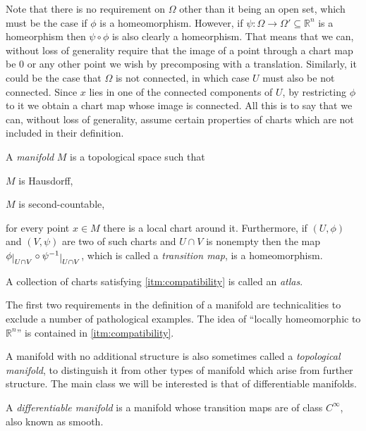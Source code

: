 \documentclass[12pt,oneside]{book}
\numberwithin{table}{section}
\numberwithin{equation}{section}
\numberwithin{figure}{section}
\newcommand{\rest}[1]{\raisebox{-.5ex}{$|$}_{#1}}
\newcommand{\R}{\mathbb{R}}
\begin{document}
Note that there is no requirement on \( \Omega \) other than it being an open set, which must be the case if \( \phi \) is a homeomorphism. However, if \( \psi \colon \Omega \to \Omega' \subseteq \R^n \) is a homeorphism then \( \psi \circ \phi \) is also clearly a homeorphism. That means that we can, without loss of generality require that the image of a point through a chart map be 0 or any other point we wish by precomposing with a translation. Similarly, it could be the case that \( \Omega \) is not connected, in which case \( U \) must also be not connected. Since \( x \) lies in one of the connected components of \( U \), by restricting \( \phi \) to it we obtain a chart map whose image is connected. All this is to say that we can, without loss of generality, assume certain properties of charts which are not included in their definition.

\begin{defn}[Manifold]
	A \emph{manifold} \( M \) is a topological space such that
	\begin{points}
		\item \( M \) is Hausdorff,
		\item \( M \) is second-countable,
		\item \label{itm:compatibility} for every point \( x \in M \) there is a local chart around it. Furthermore, if \( (U,\phi) \) and \( (V, \psi) \) are two of such charts and \( U \cap V \) is nonempty then the map \( \phi\rest{U \cap V} \circ \psi^{-1}\rest{U \cap V} \), which is called a \emph{transition map}, is a homeomorphism. 
	\end{points}
	A collection of charts satisfying \ref{itm:compatibility} is called an \emph{atlas}.
\end{defn}

The first two requirements in the definition of a manifold are technicalities to exclude a number of pathological examples. The idea of ``locally homeomorphic to \( \R^n \)'' is contained in \ref{itm:compatibility}.

A manifold with no additional structure is also sometimes called a \emph{topological manifold}, to distinguish it from other types of manifold which arise from further structure. The main class we will be interested is that of differentiable manifolds.

\begin{defn} A \emph{differentiable manifold} is a manifold whose transition maps are of class \( C^{\infty} \), also known as smooth.
\end{defn}
\end{document}

